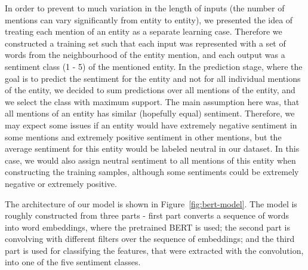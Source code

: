 \documentclass[11pt,a4paper]{article}
\begin{document}
In order to prevent to much variation in the length of inputs (the number of mentions can vary significantly from entity to entity), we presented the idea of treating each mention of an entity as a separate learning case.
Therefore we constructed a training set such that each input was represented with a set of words from the neighbourhood of the entity mention, and each output was a sentiment class (1 - 5) of the mentioned entity.
In the prediction stage, where the goal is to predict the sentiment for the entity and not for all individual mentions of the entity, we decided to sum predictions over all mentions of the entity, and we select the class with maximum support.
The main assumption here was, that all mentions of an entity has similar (hopefully equal) sentiment.
Therefore, we may expect some issues if an entity would have extremely negative sentiment in some mentions and extremely positive sentiment in other mentions, but the average sentiment for this entity would be labeled neutral in our dataset.
In this case, we would also assign neutral sentiment to all mentions of this entity when constructing the training samples, although some sentiments could be extremely negative or extremely positive.

The architecture of our model is shown in Figure~\ref{fig:bert-model}.
The model is roughly constructed from three parts - first part converts a sequence of words into word embeddings, where the pretrained BERT is used; the second part is convolving with different filters over the sequence of embeddings; and the third part is used for classifying the features, that were extracted with the convolution, into one of the five sentiment classes.
\end{document}
